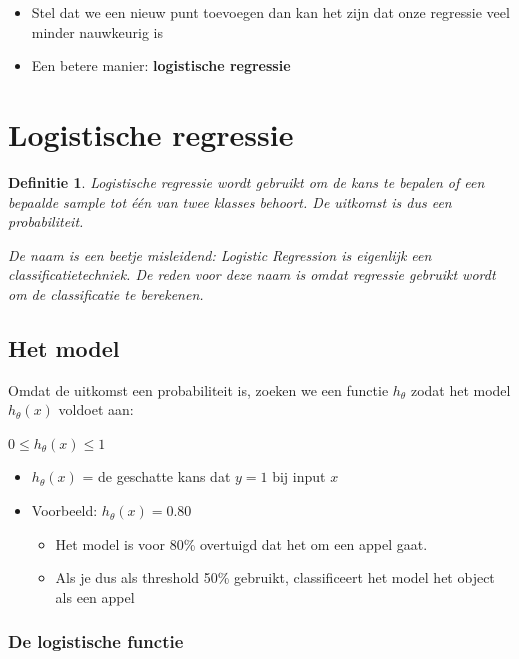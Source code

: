 \documentclass{article}
\newtheorem{theorem}{Definitie}[section]
\begin{document}
\begin{itemize}
    \item Stel dat we een nieuw punt toevoegen dan kan het zijn dat onze regressie veel minder nauwkeurig is
    \item Een betere manier: \textbf{logistische regressie}
\end{itemize}

\section{Logistische regressie}

\begin{theorem}
    Logistische regressie wordt gebruikt om de kans te bepalen of een bepaalde sample 
    tot één van twee klasses behoort. De uitkomst is dus een probabiliteit. 
    
    De naam is een beetje misleidend: Logistic Regression is eigenlijk een classificatietechniek. 
    De reden voor deze naam is omdat regressie gebruikt wordt om de classificatie te berekenen.
\end{theorem}

\subsection{Het model}

Omdat de uitkomst een probabiliteit is, zoeken we een functie $h_{\theta}$ zodat het model $h_{\theta}(x)$ voldoet aan:

\begin{center}
$0 \leq h_{\theta}(x) \leq 1$
\end{center}

\begin{itemize}
    \item $h_{\theta}(x)$ = de geschatte kans dat $y=1$ bij input $x$
    \item Voorbeeld: $h_{\theta}(x) = 0.80$
    \begin{itemize}
        \item Het model is voor 80\% overtuigd dat het om een appel gaat.
        \item Als je dus als threshold 50\% gebruikt, classificeert het model het object als een appel
    \end{itemize}
\end{itemize}

\subsubsection{De logistische functie}
\end{document}
